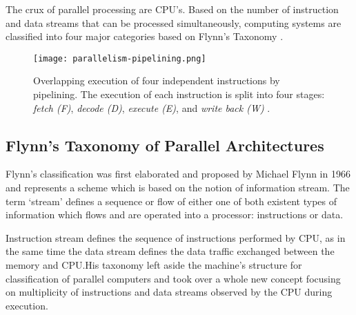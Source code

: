 The crux of parallel processing are CPU's. Based on the number of instruction and data streams that can be processed simultaneously, computing systems are classified into four major categories based on Flynn’s Taxonomy \parencite{internet7}.

\begin{figure}[h!]
	\centering
	\texttt{[image: parallelism-pipelining.png]}
	\caption{
		Overlapping execution of four independent instructions by pipelining. The execution of each instruction is split into four stages: \textit{fetch (F)}, \textit{decode (D)}, \textit{execute (E)}, and \textit{write back (W)} \parencite[see][Fig. 2.1, p11]{book1}.
	}
	\label{fig:parallelismPipe}
\end{figure}

\subsection{Flynn's Taxonomy of Parallel Architectures}\label{subchap:flynnsTax}

Flynn’s classification was first elaborated and proposed by Michael Flynn in 1966 and represents a scheme which is based on the notion of information stream. The term ‘stream’ defines a sequence or flow of either one of both existent types of information which flows and are operated into a processor: instructions or data. 

Instruction stream defines the sequence of instructions performed by CPU, as in the same time the data stream defines the data traffic exchanged between the memory and CPU.His taxonomy left aside the machine’s structure for classification of parallel computers and took over a whole new concept focusing on multiplicity of instructions and data streams observed by the CPU during execution.

\newpage

